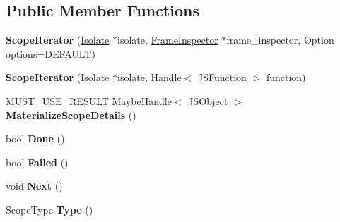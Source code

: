 \subsection*{Public Member Functions}
\begin{DoxyCompactItemize}
\item 
{\bfseries Scope\+Iterator} (\hyperlink{classv8_1_1internal_1_1_isolate}{Isolate} $\ast$isolate, \hyperlink{classv8_1_1internal_1_1_frame_inspector}{Frame\+Inspector} $\ast$frame\+\_\+inspector, Option options=D\+E\+F\+A\+U\+LT)\hypertarget{classv8_1_1internal_1_1_scope_iterator_aa5ceb578f6dda1f942249eba4365d0b7}{}\label{classv8_1_1internal_1_1_scope_iterator_aa5ceb578f6dda1f942249eba4365d0b7}

\item 
{\bfseries Scope\+Iterator} (\hyperlink{classv8_1_1internal_1_1_isolate}{Isolate} $\ast$isolate, \hyperlink{classv8_1_1internal_1_1_handle}{Handle}$<$ \hyperlink{classv8_1_1internal_1_1_j_s_function}{J\+S\+Function} $>$ function)\hypertarget{classv8_1_1internal_1_1_scope_iterator_ad8c8fb113efb2ce5476078627fea56d3}{}\label{classv8_1_1internal_1_1_scope_iterator_ad8c8fb113efb2ce5476078627fea56d3}

\item 
M\+U\+S\+T\+\_\+\+U\+S\+E\+\_\+\+R\+E\+S\+U\+LT \hyperlink{classv8_1_1internal_1_1_maybe_handle}{Maybe\+Handle}$<$ \hyperlink{classv8_1_1internal_1_1_j_s_object}{J\+S\+Object} $>$ {\bfseries Materialize\+Scope\+Details} ()\hypertarget{classv8_1_1internal_1_1_scope_iterator_aa74e9c0897ceb4c5fce55dc960d5ccb3}{}\label{classv8_1_1internal_1_1_scope_iterator_aa74e9c0897ceb4c5fce55dc960d5ccb3}

\item 
bool {\bfseries Done} ()\hypertarget{classv8_1_1internal_1_1_scope_iterator_ac44e67b01409ca5d3d12ea062f9772d1}{}\label{classv8_1_1internal_1_1_scope_iterator_ac44e67b01409ca5d3d12ea062f9772d1}

\item 
bool {\bfseries Failed} ()\hypertarget{classv8_1_1internal_1_1_scope_iterator_af35b8cb9f64079c2b0d86d07f2828825}{}\label{classv8_1_1internal_1_1_scope_iterator_af35b8cb9f64079c2b0d86d07f2828825}

\item 
void {\bfseries Next} ()\hypertarget{classv8_1_1internal_1_1_scope_iterator_a6f0a4ba9b811b41b1ced4133686a89b5}{}\label{classv8_1_1internal_1_1_scope_iterator_a6f0a4ba9b811b41b1ced4133686a89b5}

\item 
Scope\+Type {\bfseries Type} ()\hypertarget{classv8_1_1internal_1_1_scope_iterator_a9208c42e6a6da108342d6311dd399ce8}{}\label{classv8_1_1internal_1_1_scope_iterator_a9208c42e6a6da108342d6311dd399ce8}


\end{DoxyCompactItemize}
